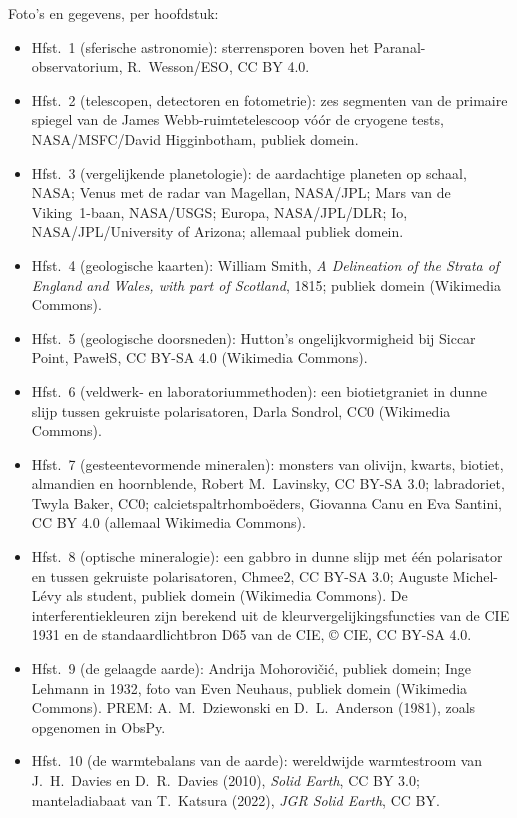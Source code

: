 \bigskip
\noindent Foto's en gegevens, per hoofdstuk:
\begin{itemize}\small
  \item Hfst.~1 (sferische astronomie): sterrensporen boven het Paranal-observatorium, R.~Wesson/ESO, CC BY 4.0.
  \item Hfst.~2 (telescopen, detectoren en fotometrie): zes segmenten van de primaire spiegel van de James Webb-ruimtetelescoop vóór de cryogene tests, NASA/MSFC/David Higginbotham, publiek domein.
  \item Hfst.~3 (vergelijkende planetologie): de aardachtige planeten op schaal, NASA; Venus met de radar van Magellan, NASA/JPL; Mars van de Viking~1-baan, NASA/USGS; Europa, NASA/JPL/DLR; Io, NASA/JPL/University of Arizona; allemaal publiek domein.
  \item Hfst.~4 (geologische kaarten): William Smith, \emph{A Delineation of the Strata of England and Wales, with part of Scotland}, 1815; publiek domein (Wikimedia Commons).
  \item Hfst.~5 (geologische doorsneden): Hutton's ongelijkvormigheid bij Siccar Point, PawełS, CC BY-SA 4.0 (Wikimedia Commons).
  \item Hfst.~6 (veldwerk- en laboratoriummethoden): een biotietgraniet in dunne slijp tussen gekruiste polarisatoren, Darla Sondrol, CC0 (Wikimedia Commons).
  \item Hfst.~7 (gesteentevormende mineralen): monsters van olivijn, kwarts, biotiet, almandien en hoornblende, Robert M.~Lavinsky, CC BY-SA 3.0; labradoriet, Twyla Baker, CC0; calcietspaltrhomboëders, Giovanna Canu en Eva Santini, CC BY 4.0 (allemaal Wikimedia Commons).
  \item Hfst.~8 (optische mineralogie): een gabbro in dunne slijp met één polarisator en tussen gekruiste polarisatoren, Chmee2, CC BY-SA 3.0; Auguste Michel-Lévy als student, publiek domein (Wikimedia Commons). De interferentiekleuren zijn berekend uit de kleurvergelijkingsfuncties van de CIE 1931 en de standaardlichtbron D65 van de CIE, \copyright{} CIE, CC BY-SA 4.0.
  \item Hfst.~9 (de gelaagde aarde): Andrija Mohorovičić, publiek domein; Inge Lehmann in 1932, foto van Even Neuhaus, publiek domein (Wikimedia Commons). PREM: A.~M.~Dziewonski en D.~L.~Anderson (1981), zoals opgenomen in ObsPy.
  \item Hfst.~10 (de warmtebalans van de aarde): wereldwijde warmtestroom van J.~H.~Davies en D.~R.~Davies (2010), \emph{Solid Earth}, CC BY 3.0; manteladiabaat van T.~Katsura (2022), \emph{JGR Solid Earth}, CC BY.

\end{itemize}
